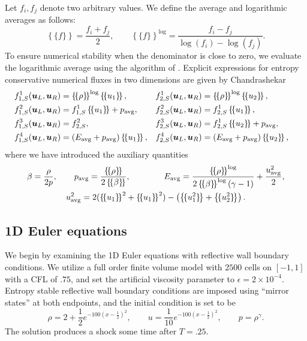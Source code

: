 \documentclass[review]{siamart171218}
\theoremstyle{assumption}
\newcommand{\pd}[2]{\frac{\partial#1}{\partial#2}}
\newcommand{\LRp}[1]{\left( #1 \right)}
\newcommand{\LRc}[1]{\left\{ #1 \right\}}
\newcommand{\avg}[1] {\ensuremath{\LRc{\!\{#1\}\!}}}
\newcommand{\note}[1]{{\color{blue}{#1}}}
\begin{document}
{Let $f_i, f_j$ denote two arbitrary values.  We define the average and logarithmic averages as follows:}
\[
{\avg{f} = \frac{f_i + f_j}{2}}, \qquad {\avg{f}^{\log} = \frac{f_i - f_j}{\log\LRp{f_i}-\log\LRp{f_j}}}.
\]
To ensure numerical stability when the denominator is close to zero, we evaluate the logarithmic average using the algorithm of \cite{ismail2009affordable}.  
Explicit expressions for entropy conservative numerical fluxes in two dimensions  are given by Chandrashekar \cite{chandrashekar2013kinetic}
\begin{align*}
&f^1_{1,S}(\bm{u}_L,\bm{u}_R) = \avg{\rho}^{\log} \avg{u_1},& &f^1_{2,S}(\bm{u}_L,\bm{u}_R) = \avg{\rho}^{\log} \avg{u_2},&\\
&f^2_{1,S}(\bm{u}_L,\bm{u}_R) = f^1_{1,S} \avg{u_1} + p_{\rm avg},&  &f^2_{2,S}(\bm{u}_L,\bm{u}_R) = f^1_{2,S} \avg{u_1},&\nonumber\\
&f^3_{1,S}(\bm{u}_L,\bm{u}_R) = f^2_{2,S},& &f^3_{2,S}(\bm{u}_L,\bm{u}_R) = f^1_{2,S} \avg{u_2} + p_{\rm avg},&\nonumber\\
&f^4_{1,S}(\bm{u}_L,\bm{u}_R) = \LRp{E_{\rm avg} + p_{\rm avg}}\avg{u_1},& &f^4_{2,S}(\bm{u}_L,\bm{u}_R) = \LRp{E_{\rm avg} + p_{\rm avg} }\avg{u_2},& \nonumber
\end{align*}
where we have introduced the auxiliary quantities 
\begin{gather}
{\beta = \frac{\rho}{2p}}, \qquad p_{\rm avg} = \frac{\avg{\rho}}{2\avg{\beta}}, \qquad \qquad E_{\rm avg} = \frac{\avg{\rho}^{\log}}{2\avg{\beta}^{\log}\LRp{\gamma -1}}   + \frac{{u_{\rm avg}^2}}{2}, \label{eq:fluxaux} \\
{u^2_{\rm avg}} = 2(\avg{u_1}^2 + \avg{u_1}^2) - \LRp{\avg{u_1^2} +\avg{u_2^2}} \nonumber.  
\end{gather}

\note{Add equations for $\pd{\bm{u}}{\bm{v}}$. }

\subsection{1D Euler equations}

We begin by examining the 1D Euler equations with reflective wall boundary conditions.  We utilize a full order finite volume model with $2500$ cells on $[-1,1]$ with a CFL of $.75$, and set the artificial viscosity parameter to $\epsilon = 2\times 10^{-4}$.  Entropy stable reflective wall boundary conditions are imposed using ``mirror states'' at both endpoints, and the initial condition is set to be 
\[
\rho = 2 + \frac{1}{2}e^{-100\LRp{x-\frac{1}{2}}^2}, \qquad 
    u = \frac{1}{10}e^{-100\LRp{x-\frac{1}{2}}^2}, \qquad p = \rho^{\gamma}.
\]
The solution produces a shock some time after $T=.25$.  
\end{document}
